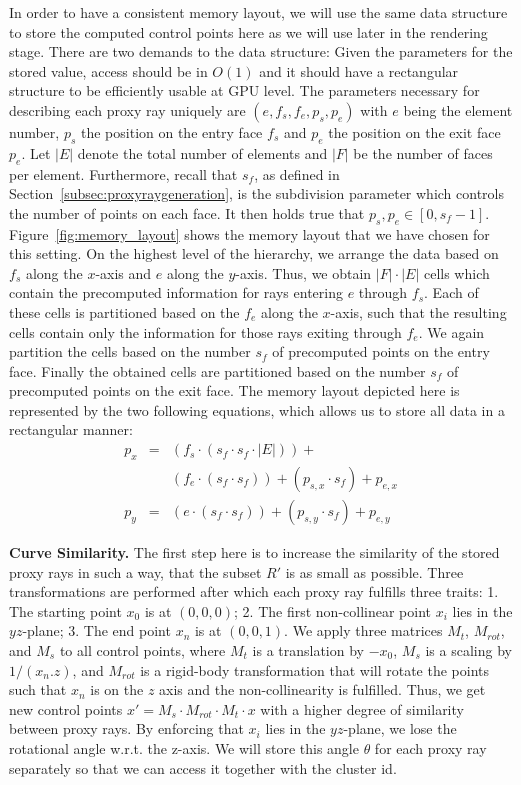 \documentclass[journal]{vgtc}                %
\begin{document}
In order to have a consistent memory layout, we will use the same data structure to store the computed control points here as we will use  later in the rendering stage. There are two demands to the data structure: Given the parameters for the stored value, access should be in $O(1)$ and it should have a rectangular structure to be efficiently usable at GPU level. The parameters necessary for describing each proxy ray uniquely are $(e, f_s, f_e, p_s, p_e)$ with $e $ being the element number, $p_s$ the position on the entry face $f_s$ and $p_e$ the position on the exit face $p_e$. Let $\left|E\right|$ denote the total number of elements and $\left|F\right|$ be the number of faces per element. Furthermore, recall that $s_f$, as defined in Section~\ref{subsec:proxyraygeneration}, is the subdivision parameter which controls the number of points on each face. It then holds true that $p_s,p_e \in [0,s_f - 1]$. Figure~\ref{fig:memory_layout} shows the memory layout that we have chosen for this setting. On the highest level of the hierarchy, we arrange the data based on $f_s$ along the $x$-axis and $e$ along the $y$-axis. Thus, we obtain $\left|F\right| \cdot \left|E\right|$ cells which contain the precomputed information for rays entering $e$ through $f_s$. Each of these cells is partitioned based on the $f_e$ along the $x$-axis, such that the resulting cells contain only the information for those rays exiting through $f_e$. We again partition the cells based on the number $s_f$ of precomputed points on the entry face. Finally the obtained cells are partitioned based on the number $s_f$ of precomputed points on the exit face. The memory layout depicted here is represented by the two following equations, which allows us to store all data in a rectangular manner:
\begin{eqnarray*}
p_x & = &(f_s \cdot (s_f \cdot s_f \cdot \left|E\right|)) + \\
	&  &(f_e \cdot (s_f \cdot s_f)) + (p_{s,x} \cdot s_f) + p_{e,x}\\
p_y & = &(e   \cdot (s_f \cdot s_f)) + (p_{s,y} \cdot s_f) + p_{e,y}
\end{eqnarray*}

\noindent \textbf{Curve Similarity.} The first step here is to increase the similarity of the stored proxy rays in such a way, that the subset $R'$ is as small as possible. Three transformations are performed after which each proxy ray fulfills three traits: 1. The starting point  $x_0$ is at $(0,0,0)$; 2. The first non-collinear point $x_i$ lies in the $yz$-plane; 3. The end point $x_n$ is at $(0,0,1)$. We apply three matrices $M_t$, $M_{rot}$, and $M_s$ to all control points, where $M_t$ is a translation by $-x_0$, $M_s$ is a scaling by $1 / (x_n.z)$, and $M_{rot}$ is a rigid-body transformation that will rotate the points such that $x_n$ is on the $z$ axis and the non-collinearity is fulfilled. Thus, we get new control points $x' = M_s \cdot M_{rot} \cdot M_t \cdot x$ with a higher degree of similarity between proxy rays. By enforcing that $x_i$ lies in the $yz$-plane, we lose the rotational angle w.r.t. the z-axis. We will store this angle $\theta$ for each proxy ray separately so that we can access it together with the cluster id.
\end{document}
